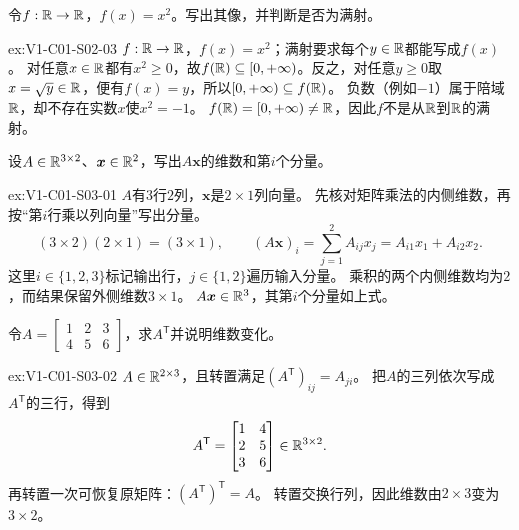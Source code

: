 \begin{SLChapterExercisePairSection}
\begin{exercise}[像与陪域]\label{ex:V1-C01-S02-03}
令$f:\mathbb{R}\to\mathbb{R}$，$f(x)=x^2$。写出其像，并判断是否为满射。
\end{exercise}
\label{sol:V1-C01-S02-03}
\begin{chapterexercisesolution}{ex:V1-C01-S02-03}
\SolGiven $f:\mathbb{R}\to\mathbb{R}$，$f(x)=x^2$；满射要求每个$y\in\mathbb{R}$都能写成$f(x)$。
\SolDerive 对任意$x\in\mathbb{R}$都有$x^2\ge0$，故$f(\mathbb{R})\subseteq[0,+\infty)$。反之，对任意$y\ge0$取$x=\sqrt y\in\mathbb{R}$，便有$f(x)=y$，所以$[0,+\infty)\subseteq f(\mathbb{R})$。
\SolCheck 负数（例如$-1$）属于陪域$\mathbb{R}$，却不存在实数$x$使$x^2=-1$。
\SolAnswer $f(\mathbb{R})=[0,+\infty)\ne\mathbb{R}$，因此$f$不是从$\mathbb{R}$到$\mathbb{R}$的满射。
\end{chapterexercisesolution}

\begin{exercise}[维数核对]\label{ex:V1-C01-S03-01}
设$A\in\mathbb{R}^{3\times2}$、$\boldsymbol{x}\in\mathbb{R}^2$，写出$A\boldsymbol{x}$的维数和第$i$个分量。
\end{exercise}
\label{sol:V1-C01-S03-01}
\begin{chapterexercisesolution}{ex:V1-C01-S03-01}
\SolGiven $A$有$3$行$2$列，$\boldsymbol{x}$是$2\times1$列向量。
\SolPlan 先核对矩阵乘法的内侧维数，再按“第$i$行乘以列向量”写出分量。
\SolDerive
\[
(3\times2)(2\times1)=(3\times1),
\qquad
(A\boldsymbol{x})_i=\sum_{j=1}^{2}A_{ij}x_j
=A_{i1}x_1+A_{i2}x_2.
\]
这里$i\in\{1,2,3\}$标记输出行，$j\in\{1,2\}$遍历输入分量。
\SolCheck 乘积的两个内侧维数均为$2$，而结果保留外侧维数$3\times1$。
\SolAnswer $A\boldsymbol{x}\in\mathbb{R}^3$，其第$i$个分量如上式。
\end{chapterexercisesolution}

\begin{exercise}[转置]\label{ex:V1-C01-S03-02}
令$A=\begin{bmatrix}1&2&3\\4&5&6\end{bmatrix}$，求$A^{\mathsf T}$并说明维数变化。
\end{exercise}
\label{sol:V1-C01-S03-02}
\begin{chapterexercisesolution}{ex:V1-C01-S03-02}
\SolGiven $A\in\mathbb{R}^{2\times3}$，且转置满足$(A^{\mathsf T})_{ij}=A_{ji}$。
\SolDerive 把$A$的三列依次写成$A^{\mathsf T}$的三行，得到
\[
A^{\mathsf T}=\begin{bmatrix}1&4\\2&5\\3&6\end{bmatrix}\in\mathbb{R}^{3\times2}.
\]
\SolCheck 再转置一次可恢复原矩阵：$(A^{\mathsf T})^{\mathsf T}=A$。
\SolAnswer 转置交换行列，因此维数由$2\times3$变为$3\times2$。
\end{chapterexercisesolution}


\end{SLChapterExercisePairSection}
